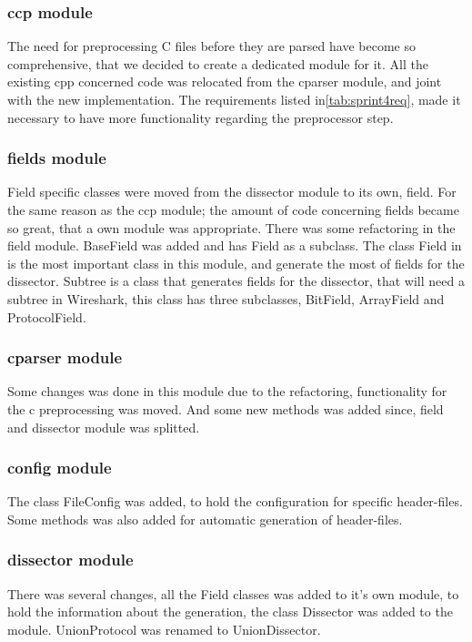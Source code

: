 \subsubsection{ccp module}
The need for preprocessing C files before they are parsed have become so comprehensive, that we decided to create a dedicated module for it. All the existing cpp concerned code was relocated from the cparser module, and joint with the new implementation. The requirements listed in\autoref{tab:sprint4req}, made it necessary to have more functionality regarding the preprocessor step. 

\subsubsection{fields module}
Field specific classes were moved from the dissector module to its own, field. For the same reason as the ccp module; the amount of code concerning fields became so great, that a own module was appropriate. There was some refactoring in the field module. BaseField was added and has Field as a subclass. The class Field in is the most important class in this module, and generate the most of fields for the dissector. Subtree is a class that generates fields for the dissector, that will need a subtree in Wireshark, this class has three subclasses, BitField, ArrayField and ProtocolField.

\subsubsection{cparser module}
Some changes was done in this module due to the refactoring, functionality for the c preprocessing was moved. And some new methods was added since, field and dissector module was splitted. 

\subsubsection{config module}
The class FileConfig was added, to hold the configuration for specific header-files. Some methods was also added for automatic generation of header-files.

\subsubsection{dissector module}
There was several changes, all the Field classes was added to it's own module, to hold the information about the generation, the class Dissector was added to the module. UnionProtocol was renamed to UnionDissector.

